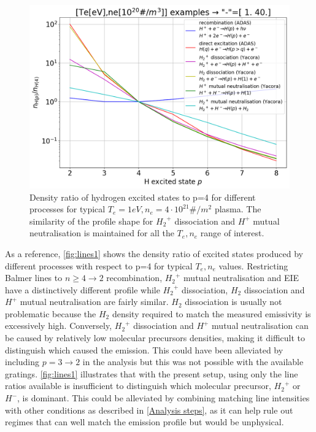 \begin{figure}
	\centering
	\includegraphics[width=0.7\linewidth,trim={0 0 0 36},clip]{Chapters/chapter3/figs/pure_rates_compare.png}
	\caption{Density ratio of hydrogen excited states to p=4 for different processes for typical $T_e=1eV,n_e=4 \cdot 10^{21}\#/m^2$ plasma. The similarity of the profile shape for ${H_2}^+$ dissociation and $H^+$ mutual neutralisation is maintained for all the $T_e,n_e$ range of interest.}
	\label{fig:lines1}
\end{figure}

As a reference, \autoref{fig:lines1} shows the density ratio of excited states produced by different processes with respect to p=4 for typical $T_e,n_e$ values. %
Restricting Balmer lines to $n \geq 4 \rightarrow 2$ recombination, ${H_2}^+$ mutual neutralisation and EIE have a distinctively different profile while ${H_2}^+$ dissociation, $H_2$ dissociation and $H^+$ mutual neutralisation are fairly similar. $H_2$ dissociation is usually not problematic because the $H_2$ density required to match the measured emissivity is excessively high. Conversely, ${H_2}^+$ dissociation and $H^+$ mutual neutralisation can be caused by relatively low molecular precursors densities, making it difficult to distinguish which caused the emission. This could have been alleviated by including $p=3 \rightarrow 2$ in the analysis\cite{Verhaegh2021a} but this was not possible with the available gratings. \autoref{fig:lines1} illustrates that with the present setup, using only the line ratios available is insufficient to distinguish which molecular precursor, ${H_2}^+$ or $H^-$, is dominant. This could be alleviated by combining matching line intensities with other conditions as described in \autoref{Analysis steps}, as it can help rule out regimes that can well match the emission profile but would be unphysical.

